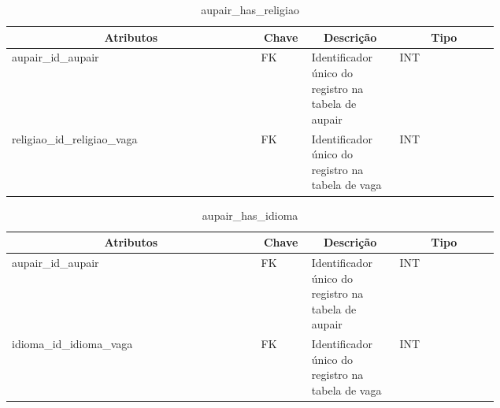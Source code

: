 \begin{enumerate}
    \begin{table}[H]
    \caption{aupair\_has\_religiao}
    \label{idioma}
    	\centering\footnotesize
        \begin{tabular}{|p{0.40\linewidth} | p{0.04\linewidth} |  p{0.12\linewidth} | p{0.16\linewidth} |}  \hline
        \multicolumn{1}{|c|}{\textbf{Atributos}} &
        \multicolumn{1}{|c|}{\textbf{Chave}} &
        \multicolumn{1}{c|}{\textbf{Descrição}} &
        \multicolumn{1}{c|}{\textbf{Tipo}} \\ \hline
          
        aupair\_id\_aupair  &  
        FK & 
        Identificador único do registro na tabela de aupair &
        INT
        \\  \hline
        
        religiao\_id\_religiao\_vaga  &  
        FK & 
        Identificador único do registro na tabela de vaga &
        INT
        \\  \hline
       
        \end{tabular}
    \end{table}
\end{enumerate}

\begin{enumerate}
    \begin{table}[H]
    \caption{aupair\_has\_idioma}
    \label{idioma}
    	\centering\footnotesize
        \begin{tabular}{|p{0.40\linewidth} | p{0.04\linewidth} |  p{0.12\linewidth} | p{0.16\linewidth} |}  \hline
        \multicolumn{1}{|c|}{\textbf{Atributos}} &
        \multicolumn{1}{|c|}{\textbf{Chave}} &
        \multicolumn{1}{c|}{\textbf{Descrição}} &
        \multicolumn{1}{c|}{\textbf{Tipo}} \\ \hline
          
        aupair\_id\_aupair  &  
        FK & 
        Identificador único do registro na tabela de aupair &
        INT
        \\  \hline
        
        idioma\_id\_idioma\_vaga  &  
        FK & 
        Identificador único do registro na tabela de vaga &
        INT
        \\  \hline
       
        \end{tabular}
    \end{table}
\end{enumerate}

